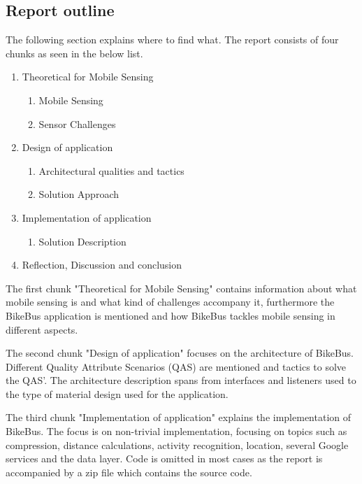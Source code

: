 \subsection{Report outline} 
The following section explains where to find what. The report consists of four chunks as seen in the below list. 

\begin{enumerate}
    \item Theoretical for Mobile Sensing
    \begin{enumerate}
        \item Mobile Sensing
        \item Sensor Challenges
    \end{enumerate}
    \item Design of application
    \begin{enumerate}
        \item Architectural qualities and tactics
        \item Solution Approach
    \end{enumerate}
    \item Implementation of application
    \begin{enumerate}
        \item Solution Description
    \end{enumerate}
    \item Reflection, Discussion and conclusion
\end{enumerate}

The first chunk "Theoretical for Mobile Sensing" contains information about what mobile sensing is and what kind of challenges accompany it, furthermore the BikeBus application is mentioned and how BikeBus tackles mobile sensing in different aspects. 

The second chunk "Design of application" focuses on the architecture of BikeBus. Different Quality Attribute Scenarios (QAS) are mentioned and tactics to solve the QAS'. The architecture description spans from interfaces and listeners used to the type of material design used for the application.

The third chunk "Implementation of application" explains the implementation of BikeBus. The focus is on non-trivial implementation, focusing on topics such as compression, distance calculations, activity recognition, location, several Google services and the data layer. Code is omitted in most cases as the report is accompanied by a zip file which contains the source code. 


